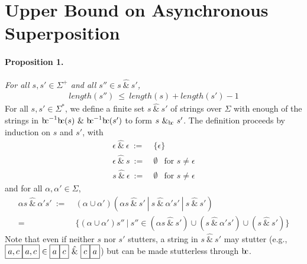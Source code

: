 \documentclass[a4paper,11pt]{article}
\newcommand{\bc}{{\rm b\!c}}
\newcommand{\vph}[1]{\vphantom{#1}}
\begin{document}
\section{Upper Bound on Asynchronous Superposition}
\paragraph{Proposition 1.} {\sl For all  $s, s' \in \Sigma^+$
and all $s''\in s\ \hat{\&}\ s'$,}
\begin{align*}
length(s'')\ \leq\ length(s) + length(s') -1
\end{align*}
\noindent
For all $s,s'\in \Sigma^{\ast}$, we define a finite set
$s~\hat{\&}~s'$ of strings over $\Sigma$ with enough of 
the strings in $\bc^{-1}\bc(s)~\&~\bc^{-1}\bc(s')$
to form $s~\&_{\bc}~s'$.
The definition proceeds by induction on $s$ and $s'$, with
\begin{align*}
\epsilon\ \hat{\&}\ \epsilon \ :=& \ \{\epsilon\}\\
\epsilon\ \hat{\&}\ s \ :=& \ \emptyset\ \ \mbox{ for } s\neq\epsilon\\
s\ \hat{\&}\ \epsilon \ :=& \ \emptyset\ \ \mbox{ for } s\neq\epsilon
\end{align*}
and for all $\alpha,\alpha'\in \Sigma$,
\begin{align*}
\alpha s~\hat{\&}~\alpha's' \ :=& \ 
(\alpha\cup \alpha')(\alpha s\ \hat{\&}\ s'
\ | \ s~\hat{\&}~\alpha's' \ | \  s~\hat{\&}~s')\\
=&~\{(\alpha\cup\alpha')s''\ | \ s''\in (\alpha s~\hat{\&}~s') \cup 
(s~\hat{\&}~\alpha's') \cup (s~\hat{\&}~s')\}
\end{align*}
Note that even if neither $s$ nor $s'$ stutters,
a string in $s\ \hat{\&}\ s'$ may stutter
(e.g., $\fbox{$a,c\vph{,'}$}\fbox{$a,c\vph{,'}$}\in
\fbox{$a\vph{,'}$}\fbox{$c\vph{,'}$}\ \hat{\&}\ 
\fbox{$c\vph{,'}$}\fbox{$a\vph{,'}$}$)
but can be made stutterless through $\bc$.
\end{document}

